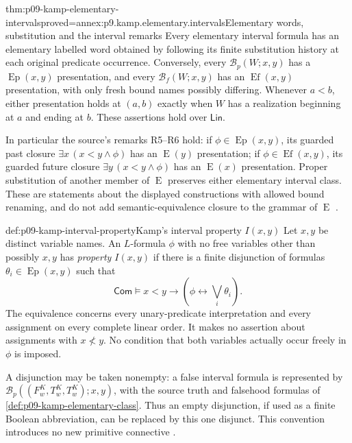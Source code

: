 \begin{hblemma}{thm:p09-kamp-elementary-intervals}{proved=annex:p9.kamp.elementary.intervals}{Elementary words, substitution and the interval remarks}
Every elementary interval formula has an elementary labelled word obtained
by following its finite substitution history at each original predicate
occurrence. Conversely, every \(\mathcal B_p(W;x,y)\) has a
\(\operatorname{Ep}(x,y)\) presentation, and every
\(\mathcal B_f(W;x,y)\) has an \(\operatorname{Ef}(x,y)\)
presentation, with only fresh bound names possibly differing.
Whenever \(a<b\), either presentation holds at \((a,b)\) exactly when
\(W\) has a realization beginning at \(a\) and ending at \(b\).
These assertions hold over \(\mathsf{Lin}\).

In particular the source's remarks R5--R6 hold: if
\(\phi\in\operatorname{Ep}(x,y)\), its guarded past closure
\(\exists x\,(x<y\land\phi)\) has an \(\operatorname{E}(y)\)
presentation; if \(\phi\in\operatorname{Ef}(x,y)\), its guarded
future closure \(\exists y\,(x<y\land\phi)\) has an
\(\operatorname{E}(x)\) presentation. Proper substitution of another
member of \(\operatorname{E}\) preserves either elementary interval
class. These are statements about the displayed constructions with allowed
bound renaming, and do not add semantic-equivalence closure to the grammar
of \(\operatorname{E}\) \cite[ch.~III, pp.~67--68]{Kamp1968}.
\end{hblemma}

\begin{hbdefinition}{def:p09-kamp-interval-property}{Kamp's interval property \(I(x,y)\)}
Let \(x,y\) be distinct variable names. An \(L\)-formula \(\phi\)
with no free variables other than possibly
\(x,y\) has \emph{property \(I(x,y)\)} if there is a finite
disjunction of formulas \(\theta_i\in\operatorname{Ep}(x,y)\) such that
\[
 \mathsf{Com}\models
 x<y\longrightarrow
             \left(\phi\longleftrightarrow\bigvee_i\theta_i\right).
\]
The equivalence concerns every unary-predicate interpretation and every
assignment on every complete linear order. It makes no assertion about
assignments with \(x\not<y\). No condition that both variables actually
occur freely in \(\phi\) is imposed.

A disjunction may be taken nonempty: a false interval formula is represented
by \(\mathcal B_p((F^K_w,T^K_w,T^K_w);x,y)\), with the source
truth and falsehood formulas of \cref{def:p09-kamp-elementary-class}.
Thus an empty disjunction, if used as a finite Boolean abbreviation, can
be replaced by this one disjunct. This convention introduces no new
primitive connective \cite[ch.~III, p.~68, display~(13)]{Kamp1968}.
\end{hbdefinition}


